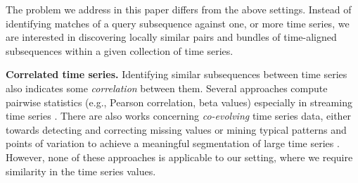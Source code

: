 The problem we address in this paper differs from the above settings. Instead of identifying matches of a query subsequence against one, or more time series, we are interested in discovering locally similar pairs and bundles of time-aligned subsequences within a given collection of time series.








\begin{comment}
In \cite{yeh2016matrix}, the authors tackle the problem of time series subsequences \textit{all-pairs-similarity-search}, or \textit{full similarity joins}, as it is mostly regarded in the literature. The authors are interested in full similarity joins on all possible subsequences of one (self-join) or two given time series, that is, for each possible subsequence, detect its \textit{nearest neighbor}. They introduce the \textit{matrix profile}, which is a vector of the Euclidean distances among each pair within a \textit{similarity join set} (i.e., a set containing pairs of each subsequence with its nearest neighbor). They also introduce the \textit{matrix profile index} that contains the actual locations of the nearest neighbor of each subsequence. Matrix profile and its index are themselves the result of the full joins.
\end{comment}

\begin{comment}
After defining a \textit{mindist} that is calculated among a given query and a time series envelope held within each node, they introduce approximate and exact \textit{k-nearest neighbors} search solutions. 
\end{comment}

\textbf{Correlated time series.}
Identifying similar subsequences between time series also indicates some {\em correlation} between them. Several approaches compute pairwise statistics (e.g., Pearson correlation, beta values) especially in streaming time series \cite{zhu2002statstream,cole2005fast,papadimitriou2006local}. There are also works concerning {\em co-evolving} time series data, either towards detecting and correcting missing values \cite{yongjie2015fast} or mining typical patterns and points of variation to achieve a meaningful segmentation of large time series \cite{matsubara2014autoplait}. However, none of these approaches is applicable to our setting, where we require similarity in the time series values. 



